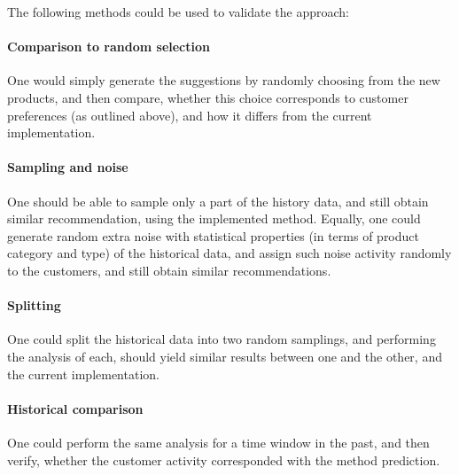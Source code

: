 \documentclass{report}
\begin{document}
The following methods could be used to validate the approach:

\paragraph{Comparison to random selection} One would simply generate the suggestions by randomly choosing from the new products, and
then compare, whether this choice corresponds to customer preferences (as outlined above), and how it differs from the current
implementation.

\paragraph{Sampling and noise} One should be able to sample only a part of the history data, and still obtain similar recommendation, using the 
implemented method. Equally, one could generate random extra noise with statistical properties (in terms of product category and type) of the 
historical data, and assign such noise activity randomly to the customers, and still obtain similar recommendations.

\paragraph{Splitting} One could split the historical data into two random samplings, and performing the analysis of each, should yield similar
results between one and the other, and the current implementation.

\paragraph{Historical comparison} One could perform the same analysis for a time window in the past, and then verify, whether the customer activity
corresponded with the method prediction.
\end{document}
